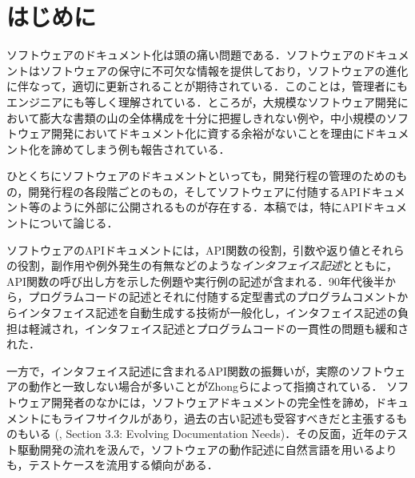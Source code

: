 \section {はじめに}

ソフトウェアのドキュメント化は頭の痛い問題である．\cite{clements-2010-documenting-software-architectures:-views-and-beyond,boswell-2011-the-art-of-readable-code:-simple-and-practical-techniques}ソフトウェアのドキュメントはソフトウェアの保守に不可欠な情報を提供しており，ソフトウェアの進化に伴なって，適切に更新されることが期待されている．このことは，管理者にもエンジニアにも等しく理解されている．ところが，大規模なソフトウェア開発において膨大な書類の山の全体構成を十分に把握しきれない例や，中小規模のソフトウェア開発においてドキュメント化に資する余裕がないことを理由にドキュメント化を諦めてしまう例も報告されている．%
\cite {%
  forward-2002-the-relevance-of-software-documentation-tools-and-technologies:}

ひとくちにソフトウェアのドキュメントといっても，開発行程の管理のためのもの，開発行程の各段階ごとのもの，そしてソフトウェアに付随するAPIドキュメント等のように外部に公開されるものが存在する．本稿では，特にAPIドキュメントについて論じる．

ソフトウェアのAPIドキュメントには，API関数の役割，引数や返り値とそれらの役割，副作用や例外発生の有無などのような\emph {インタフェイス記述}とともに，API関数の呼び出し方を示した例題や実行例の記述が含まれる．90年代後半から，プログラムコードの記述とそれに付随する定型書式のプログラムコメントからインタフェイス記述を自動生成する技術が一般化し，インタフェイス記述の負担は軽減され，インタフェイス記述とプログラムコードの一貫性の問題も緩和された．%
\cite {%
  kramer-1999-api-documentation-from-source-code-comments:,%
  hoffman-2003-api-documentation-with-executable-examples,%
  aguiar-2005-wikiwiki-weaving-heterogeneous-software-artifacts,%
  normark-2009-the-vicinity-of-program-documentation-tools,%
  rust-lang.org-2016-the-rust-programming-language-chapter-5.4-documentation}

一方で，インタフェイス記述に含まれるAPI関数の振舞いが，実際のソフトウェアの動作と一致しない場合が多いことがZhongらによって指摘されている\cite{zhong-2013-detecting-api-documentation-errors}．%
ソフトウェア開発者のなかには，ソフトウェアドキュメントの完全性を諦め，ドキュメントにもライフサイクルがあり，過去の古い記述も受容すべきだと主張するものもいる (\cite{forward-2002-the-relevance-of-software-documentation-tools-and-technologies:}, Section 3.3: Evolving Documentation Needs)．その反面，近年のテスト駆動開発の流れを汲んで，ソフトウェアの動作記述に自然言語を用いるよりも，テストケースを流用する傾向がある．%
\cite {%
  hoffman-2003-api-documentation-with-executable-examples,%
  stylos-2009-jadeite:-improving-api-documentation-using-usage,%
  kr:amer-2016-using-runtime-traces-to-improve-documentation}

